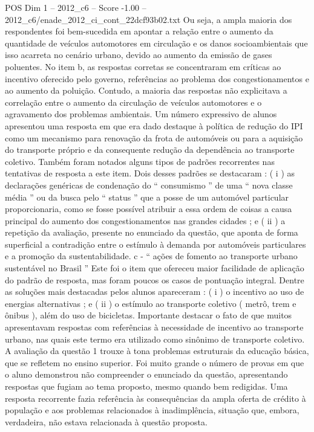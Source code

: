 \begin{textsample}{POS Dim 1 – 2012\_c6 – Score -1.00 – 2012\_c6/enade\_2012\_ci\_cont\_22dcf93b02.txt}
Ou seja, a ampla maioria dos respondentes foi bem-sucedida em apontar a relação entre o aumento da quantidade de veículos automotores em circulação e os danos socioambientais que isso acarreta no cenário urbano, devido ao aumento da emissão de gases poluentes.
No item b, as respostas corretas se concentraram em críticas ao incentivo oferecido pelo governo, referências ao problema dos congestionamentos e ao aumento da poluição.
Contudo, a maioria das respostas não explicitava a correlação entre o aumento da circulação de veículos automotores e o agravamento dos problemas ambientais.
Um número expressivo de alunos apresentou uma resposta em que era dado destaque à política de redução do IPI como um mecanismo para renovação da frota de automóveis ou para a aquisição do transporte próprio e da consequente redução da dependência ao transporte coletivo.
Também foram notados alguns tipos de padrões recorrentes nas tentativas de resposta a este item.
Dois desses padrões se destacaram : ( i ) as declarações genéricas de condenação do “ consumismo ” de uma “ nova classe média ” ou da busca pelo “ status ” que a posse de um automóvel particular proporcionaria, como se fosse possível atribuir a essa ordem de coisas a causa principal do aumento dos congestionamentos nas grandes cidades ; e ( ii ) a repetição da avaliação, presente no enunciado da questão, que aponta de forma superficial a contradição entre o estímulo à demanda por automóveis particulares e a promoção da sustentabilidade. c - “ ações de fomento ao transporte urbano sustentável no Brasil ” Este foi o item que ofereceu maior facilidade de aplicação do padrão de resposta, mas foram poucos os casos de pontuação integral.
Dentre as soluções mais destacadas pelos alunos apareceram : ( i ) o incentivo ao uso de energias alternativas ; e ( ii ) o estímulo ao transporte coletivo ( metrô, trem e ônibus ), além do uso de bicicletas.
Importante destacar o fato de que muitos apresentavam respostas com referências à necessidade de incentivo ao transporte urbano, nas quais este termo era utilizado como sinônimo de transporte coletivo.
A avaliação da questão 1 trouxe à tona problemas estruturais da educação básica, que se refletem no ensino superior.
Foi muito grande o número de provas em que o aluno demonstrou não compreender o enunciado da questão, apresentando respostas que fugiam ao tema proposto, mesmo quando bem redigidas.
Uma resposta recorrente fazia referência às consequências da ampla oferta de crédito à população e aos problemas relacionados à inadimplência, situação que, embora, verdadeira, não estava relacionada à questão proposta.

\end{textsample}
